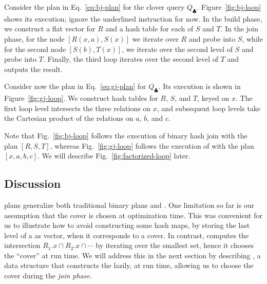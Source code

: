 \begin{ex}\label{ex:binary-free-join}
  Consider the plan in Eq.~\eqref{eq:bj-plan} for the clover query $Q_\clubsuit$.
  Figure~\ref{fig:bj-loop} shows its execution; ignore the underlined
  instruction for now.
  In the build phase, 
    we construct a flat vector for $R$ and a hash table for each of $S$ and $T$.
  In the join phase, for the  node $[R(x, a), S(x)]$  we 
   iterate over $R$ and probe into $S$, while for the second node $[S(b), T(x)]$,
    we iterate over the second level of $S$ and probe into $T$.
  Finally, the third loop iterates over the second level of $T$ and outputs the result.
\end{ex}

\begin{ex}\label{ex:generic-free-join}
  Consider now the plan in Eq.~\eqref{eq:gj-plan} for  $Q_\clubsuit$.
  Its execution is shown in Figure~\ref{fig:gj-loop}.
  We construct  hash tables for $R$, $S$, and $T$, keyed on $x$.
  The first loop level intersects the three relations on $x$, 
    and subsequent loop levels take the Cartesian product of the relations on $a$, $b$, and $c$.
\end{ex}

Note that Fig.~\ref{fig:bj-loop}
  follows the execution of binary hash join with the plan $[R, S, T]$,
  whereas Fig.~\ref{fig:gj-loop} follows the execution of \GJ
   with the plan $[x, a, b, c]$.  We will describe
   Fig.~\ref{fig:factorized-loop} later.

\subsection{Discussion}

\FJ plans generalize both traditional binary plans and \GJ.  
One
limitation so far is our assumption that the cover is chosen at
optimization time.  This was convenient for us to illustrate how
to avoid constructing some hash maps, by storing the last level of a
\GHT as vector, when it corresponds to a cover.  In contrast, \GJ
computes the intersection $R_1.x\cap R_2.x\cap \cdots$ by iterating
over the smallest set, hence it chooses the ``cover'' at run time.  We
will address this in the next section by describing \COLT, a data
structure that constructs the \GHT lazily, at run time, allowing us to
choose the cover during the {\em join phase}.

